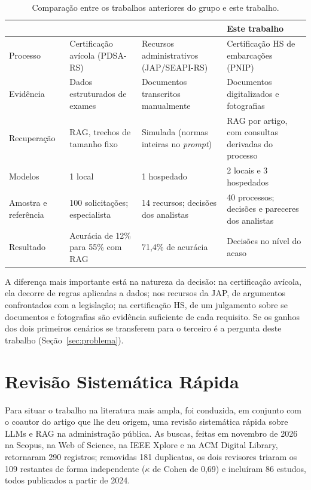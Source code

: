 \begin{table}[htb]
	\centering
	\caption{Comparação entre os trabalhos anteriores do grupo e este trabalho.}
	\label{tab:tr-grupo}
	\footnotesize
	\setlength{\tabcolsep}{3pt}
	\begin{tabular}{|L{0.17\textwidth}|L{0.24\textwidth}|L{0.24\textwidth}|L{0.24\textwidth}|}
		\hline
		& \textbf{} & \textbf{} & \textbf{Este trabalho} \\
		\hline
		Processo & Certificação avícola (PDSA-RS) & Recursos administrativos (JAP/SEAPI-RS) & Certificação HS de embarcações (PNIP) \\
		\hline
		Evidência & Dados estruturados de exames & Documentos transcritos manualmente & Documentos digitalizados e fotografias \\
		\hline
		Recuperação & RAG, trechos de tamanho fixo & Simulada (normas inteiras no \textit{prompt}) & RAG por artigo, com consultas derivadas do processo \\
		\hline
		Modelos & 1 local & 1 hospedado & 2 locais e 3 hospedados \\
		\hline
		Amostra e referência & 100 solicitações; especialista & 14 recursos; decisões dos analistas & 40 processos; decisões e pareceres dos analistas \\
		\hline
		Resultado & Acurácia de 12\% para 55\% com RAG & 71,4\% de acurácia & Decisões no nível do acaso \\
		\hline
	\end{tabular}
\end{table}

A diferença mais importante está na natureza da decisão: na certificação avícola, ela decorre de regras aplicadas a dados; nos recursos da JAP, de argumentos confrontados com a legislação; na certificação HS, de um julgamento sobre se documentos e fotografias são evidência suficiente de cada requisito. Se os ganhos dos dois primeiros cenários se transferem para o terceiro é a pergunta deste trabalho (Seção~\ref{sec:problema}).

\section{Revisão Sistemática Rápida}
\label{sec:rsl}

Para situar o trabalho na literatura mais ampla, foi conduzida, em conjunto com o coautor do artigo que lhe deu origem, uma revisão sistemática rápida sobre LLMs e RAG na administração pública. As buscas, feitas em novembro de 2026 na Scopus, na Web of Science, na IEEE Xplore e na ACM Digital Library, retornaram 290 registros; removidas 181 duplicatas, os dois revisores triaram os 109 restantes de forma independente ($\kappa$ de Cohen \cite{Cohen1960} de 0,69) e incluíram 86 estudos, todos publicados a partir de 2024.

